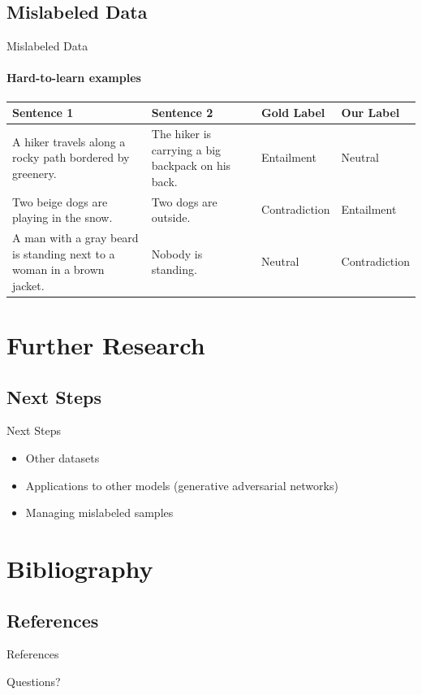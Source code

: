 \documentclass[
	11pt,
]{beamer}
\begin{document}
\subsection{Mislabeled Data}
\begin{frame}{Mislabeled Data}
	\framesubtitle{Hard-to-learn examples}
	\begin{table}
		\fontsize{8pt}{10pt}\selectfont
		\centering
		\begin{tabular}{| M{3cm} | M{3cm} | M{2cm} | M{2cm} |}
			\hline
			Sentence 1                                                             & Sentence 2                                        & Gold Label    & Our Label     \\ \hline
			A hiker travels along a rocky path bordered by greenery.               & The hiker is carrying a big backpack on his back. & Entailment    & Neutral       \\ \hline
			Two beige dogs are playing in the snow.                                & Two dogs are outside.                             & Contradiction & Entailment    \\ \hline
			A man with a gray beard is standing next to a woman in a brown jacket. & Nobody is standing.                               & Neutral       & Contradiction \\
			\hline
		\end{tabular}
	\end{table}
\end{frame}



\section{Further Research}

\subsection{Next Steps}
\begin{frame}{Next Steps}
	\fontsize{12pt}{16pt}\selectfont
	\begin{itemize}
		\item Other datasets
		      \vspace{.5cm}
		\item Applications to other models (generative adversarial networks)
		      \vspace{.5cm}
		\item Managing mislabeled samples
	\end{itemize}
\end{frame}

\section{Bibliography}

\subsection{References}
\begin{frame}{References}
	\nocite{*}
	\printbibliography
\end{frame}



\begin{frame}[plain]
	\begin{center}


		{\LARGE Questions?}
	\end{center}
\end{frame}
\end{document}
